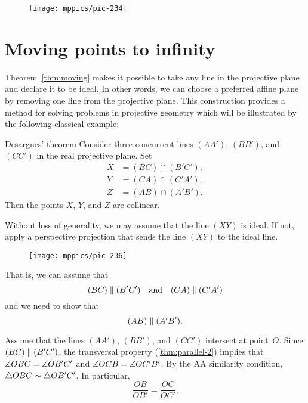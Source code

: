 {

\begin{wrapfigure}{r}{37mm}
\vskip6mm
\centering
\texttt{[image: mppics/pic-234]}
\end{wrapfigure}

\section*{Moving points to infinity}


Theorem~\ref{thm:moving} makes it possible to take any line in the projective plane and declare it to be ideal.
In other words, we can choose a preferred affine plane by removing one line from the projective plane.
This construction provides a method for solving problems in projective geometry 
which will be illustrated by the following classical example:


\begin{thm}{Desargues' theorem}\label{thm:desargues}
Consider three concurrent lines $(AA')$, $(BB')$, and $(CC')$ in the real projective plane.
Set
\begin{align*}
X&=(BC)\cap (B'C'),\\
Y&=(CA)\cap (C'A'),\\
Z&=(AB)\cap (A'B').
\end{align*}
Then the points $X$, $Y$, and $Z$ are collinear.
\end{thm}

}

Without loss of generality, we may assume that the line $(XY)$ is ideal.
If not, apply a perspective projection that sends the line $(XY)$ to the ideal line.

\begin{wrapfigure}{o}{40mm}
\vskip-8mm
\centering
\texttt{[image: mppics/pic-236]}
\end{wrapfigure}

That is, we can assume that 
\[(BC)\z\parallel (B'C')\quad\text{and}\quad(CA)\z\parallel (C'A')\]
and we need to show that 
\[(AB)\z\parallel(A'B').\]

Assume that the lines $(AA')$, $(BB')$, and $(CC')$ intersect at point~$O$.
Since $(BC)\z\parallel (B'C')$, 
the transversal property (\ref{thm:parallel-2}) implies that $\measuredangle OBC\z= \measuredangle OB'C'$ and $\measuredangle OCB\z= \measuredangle OC'B'$.
By the AA similarity condition, $\triangle OBC\z\sim\triangle OB'C'$.
In particular,
\[\frac{OB}{OB'}=\frac{OC}{OC'}.\]

